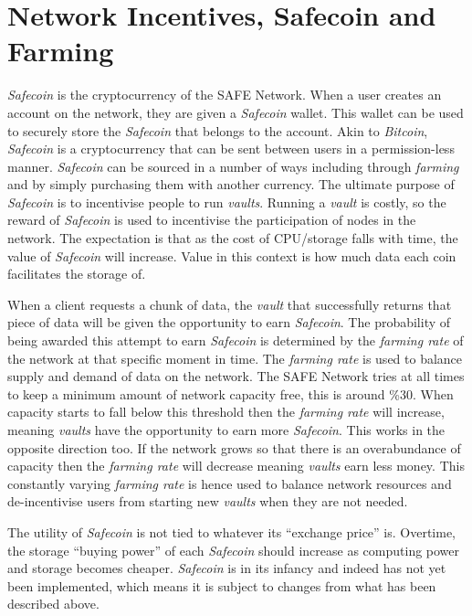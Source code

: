 \section{Network Incentives, Safecoin and Farming}

\textit{Safecoin}\cite{lambert2015safecoin} is the cryptocurrency of the SAFE Network. When a user creates an account on the network, they are given a \textit{Safecoin} wallet. This wallet can be used to securely store the \textit{Safecoin} that belongs to the account. Akin to \textit{Bitcoin}, \textit{Safecoin} is a cryptocurrency that can be sent between users in a permission-less manner. \textit{Safecoin} can be sourced in a number of ways including through \textit{farming} and by simply purchasing them with another currency. The ultimate purpose of \textit{Safecoin} is to incentivise people to run \textit{vaults}. Running a \textit{vault} is costly, so the reward of \textit{Safecoin} is used to incentivise the participation of nodes in the network. The expectation is that as the cost of CPU/storage falls with time, the value of \textit{Safecoin} will increase. Value in this context is how much data each coin facilitates the storage of.

When a client requests a chunk of data, the \textit{vault} that successfully returns that piece of data will be given the opportunity to earn \textit{Safecoin}. The probability of being awarded this attempt to earn \textit{Safecoin} is determined by the \textit{farming rate} of the network at that specific moment in time. The \textit{farming rate} is used to balance supply and demand of data on the network. The SAFE Network tries at all times to keep a minimum amount of network capacity free, this is around \%30. When capacity starts to fall below this threshold then the \textit{farming rate} will increase, meaning \textit{vaults} have the opportunity to earn more \textit{Safecoin}. This works in the opposite direction too. If the network grows so that there is an overabundance of capacity then the \textit{farming rate} will decrease meaning \textit{vaults} earn less money. This constantly varying \textit{farming rate} is hence used to balance network resources and de-incentivise users from starting new \textit{vaults} when they are not needed.

The utility of \textit{Safecoin} is not tied to whatever its ``exchange price'' is. Overtime, the storage ``buying power'' of each \textit{Safecoin} should increase as computing power and storage becomes cheaper. \textit{Safecoin} is in its infancy and indeed has not yet been implemented, which means it is subject to changes from what has been described above.

